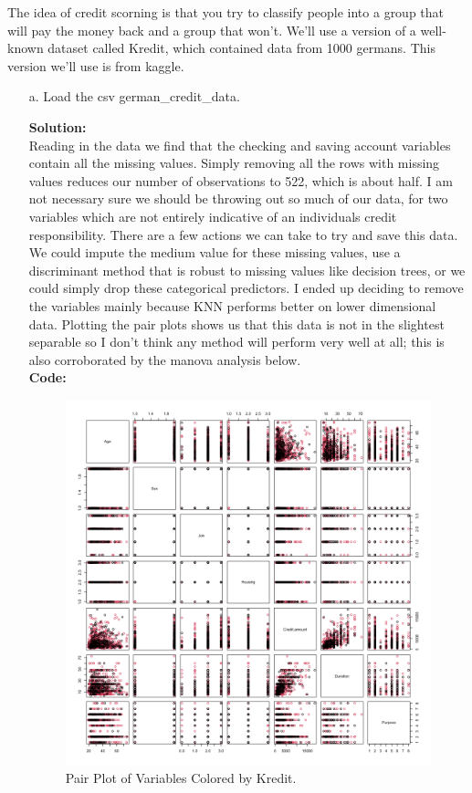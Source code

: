 \documentclass[12pt]{article}
\makeatletter
\theoremstyle{homework}
\newenvironment{exercise}[1]
{\def\@currentlabel{#1}\exercisecore}
{\endexercisecore}
\newcommand{\localhead}[1]{\par\smallskip\noindent\textbf{#1}\nobreak\\}%
\newcommand\solution{\localhead{Solution:}}
\makeatother
\begin{document}
\begin{exercise}{1} The idea of credit scorning is that you try to classify people into a group that will pay the money back and a group that won't. We'll use a version of a well-known dataset called Kredit, 
  which contained data from 1000 germans. This version we'll use is from kaggle.\\
  \begin{enumerate}
    \item[a.] Load the csv german\_credit\_data.\\
    \solution Reading in the data we find that the checking and saving account variables contain all the missing values. Simply removing all the rows with missing values reduces our number of observations to 522, which is about half.
    I am not necessary sure we should be throwing out so much of our data, for two variables which are not entirely indicative of an individuals credit responsibility. There are a few actions we can take to try and save this data.
    We could impute the medium value for these missing values, use a discriminant method that is robust to missing values like decision trees, or we could simply drop these categorical predictors. I ended up deciding to remove the variables mainly because KNN performs better on lower dimensional data.
    Plotting the pair plots shows us that this data is not in the slightest separable so I don't think any method will perform very well at all; this is also corroborated by the manova analysis below.\\
      \textbf{Code:}
      \begin{center}
      
      \end{center}
      \vspace{.15in}
      \begin{figure}[H]
        \begin{center}
          \caption{Pair Plot of Variables Colored by Kredit.}
        \includegraphics[width = \textwidth]{Rplot03.png}

\end{center}
\end{figure}
\end{enumerate}
\end{exercise}
\end{document}
